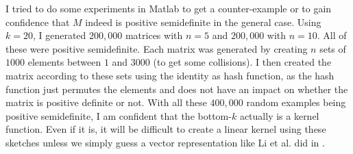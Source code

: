 I tried to do some experiments in Matlab to get a counter-example or to gain
confidence that $M$ indeed is positive semidefinite in the general case. Using
$k=20$, I generated $200,000$ matrices with $n=5$ and $200,000$ with $n=10$.
All of these were positive semidefinite. Each matrix was generated by creating
$n$ sets of $1000$ elements between $1$ and $3000$ (to get some collisions).
I then created the matrix according to these sets using the identity as hash
function, as the hash function just permutes the elements and does not have
an impact on whether the matrix is positive definite or not. With all these
$400,000$ random examples being positive semidefinite, I am confident that the
bottom-$k$ actually is a kernel function. Even if it is, it will be difficult
to create a linear kernel using these sketches unless we simply guess a vector
representation like Li et al. did in \cite{Li11}.
